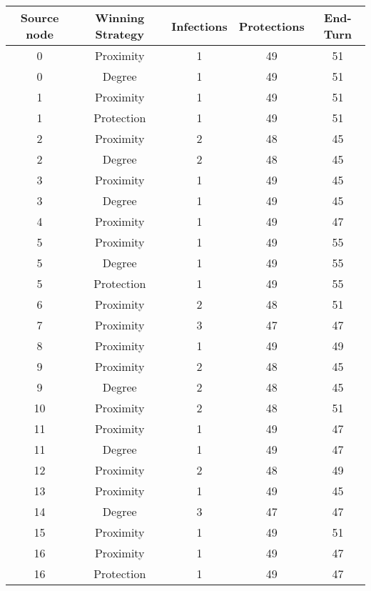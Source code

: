 \documentclass[results.tex]{subfiles}
\begin{document}
\begin{center}
  \begin{tabular}{| c || c | c | c | c |}
    \hline
    {\bfseries Source node} & {\bfseries Winning Strategy} & {\bfseries Infections} & {\bfseries Protections} & {\bfseries End-Turn} \\  %
    \hline\hline
    0 & Proximity & 1 & 49 & 51 \\ 
    \hline
    0 & Degree & 1 & 49 & 51 \\ 
    \hline
    1 & Proximity & 1 & 49 & 51 \\ 
    \hline
    1 & Protection & 1 & 49 & 51 \\ 
    \hline
    2 & Proximity & 2 & 48 & 45 \\ 
    \hline
    2 & Degree & 2 & 48 & 45 \\ 
    \hline
    3 & Proximity & 1 & 49 & 45 \\ 
    \hline
    3 & Degree & 1 & 49 & 45 \\ 
    \hline
    4 & Proximity & 1 & 49 & 47 \\ 
    \hline
    5 & Proximity & 1 & 49 & 55 \\ 
    \hline
    5 & Degree & 1 & 49 & 55 \\ 
    \hline
    5 & Protection & 1 & 49 & 55 \\ 
    \hline
    6 & Proximity & 2 & 48 & 51 \\ 
    \hline
    7 & Proximity & 3 & 47 & 47 \\ 
    \hline
    8 & Proximity & 1 & 49 & 49 \\ 
    \hline
    9 & Proximity & 2 & 48 & 45 \\ 
    \hline
    9 & Degree & 2 & 48 & 45 \\ 
    \hline
    10 & Proximity & 2 & 48 & 51 \\ 
    \hline
    11 & Proximity & 1 & 49 & 47 \\ 
    \hline
    11 & Degree & 1 & 49 & 47 \\ 
    \hline
    12 & Proximity & 2 & 48 & 49 \\ 
    \hline
    13 & Proximity & 1 & 49 & 45 \\ 
    \hline
    14 & Degree & 3 & 47 & 47 \\ 
    \hline
    15 & Proximity & 1 & 49 & 51 \\ 
    \hline
    16 & Proximity & 1 & 49 & 47 \\ 
    \hline
    16 & Protection & 1 & 49 & 47 \\ 
    \hline

\end{tabular}
\end{center}
\end{document}
